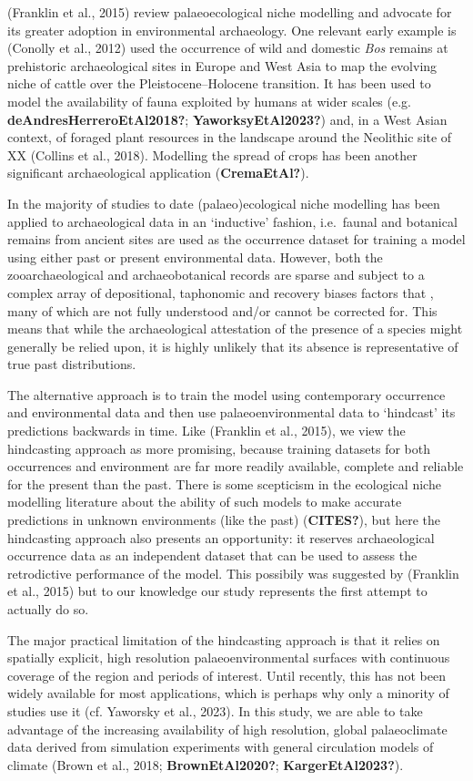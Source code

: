 \documentclass[
  number,
  review]{elsarticle}
\begin{document}
(Franklin et al., 2015) review palaeoecological niche modelling and
advocate for its greater adoption in environmental archaeology. One
relevant early example is (Conolly et al., 2012) used the occurrence of
wild and domestic \emph{Bos} remains at prehistoric archaeological sites
in Europe and West Asia to map the evolving niche of cattle over the
Pleistocene--Holocene transition. It has been used to model the
availability of fauna exploited by humans at wider scales (e.g.
\textbf{deAndresHerreroEtAl2018?}; \textbf{YaworksyEtAl2023?}) and, in a
West Asian context, of foraged plant resources in the landscape around
the Neolithic site of XX (Collins et al., 2018). Modelling the spread of
crops has been another significant archaeological application
(\textbf{CremaEtAl?}).

In the majority of studies to date (palaeo)ecological niche modelling
has been applied to archaeological data in an `inductive' fashion,
i.e.~faunal and botanical remains from ancient sites are used as the
occurrence dataset for training a model using either past or present
environmental data. However, both the zooarchaeological and
archaeobotanical records are sparse and subject to a complex array of
depositional, taphonomic and recovery biases factors that , many of
which are not fully understood and/or cannot be corrected for. This
means that while the archaeological attestation of the presence of a
species might generally be relied upon, it is highly unlikely that its
absence is representative of true past distributions.

The alternative approach is to train the model using contemporary
occurrence and environmental data and then use palaeoenvironmental data
to `hindcast' its predictions backwards in time. Like (Franklin et al.,
2015), we view the hindcasting approach as more promising, because
training datasets for both occurrences and environment are far more
readily available, complete and reliable for the present than the past.
There is some scepticism in the ecological niche modelling literature
about the ability of such models to make accurate predictions in unknown
environments (like the past) (\textbf{CITES?}), but here the hindcasting
approach also presents an opportunity: it reserves archaeological
occurrence data as an independent dataset that can be used to assess the
retrodictive performance of the model. This possibily was suggested by
(Franklin et al., 2015) but to our knowledge our study represents the
first attempt to actually do so.

The major practical limitation of the hindcasting approach is that it
relies on spatially explicit, high resolution palaeoenvironmental
surfaces with continuous coverage of the region and periods of interest.
Until recently, this has not been widely available for most
applications, which is perhaps why only a minority of studies use it
(cf. Yaworsky et al., 2023). In this study, we are able to take
advantage of the increasing availability of high resolution, global
palaeoclimate data derived from simulation experiments with general
circulation models of climate (Brown et al., 2018;
\textbf{BrownEtAl2020?}; \textbf{KargerEtAl2023?}).
\end{document}

